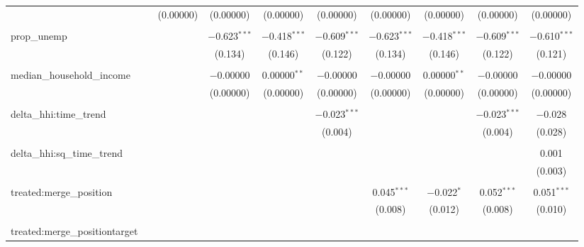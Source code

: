 \begin{table}[H]
{\begin{tabular}{@{\extracolsep{5pt}}lccccccccc}
   &  & (0.00000) & (0.00000) & (0.00000) & (0.00000) & (0.00000) & (0.00000) & (0.00000) & (0.00000) \\  

   & & & & & & & & & \\  

  prop\_unemp &  &  & $-$0.623$^{***}$ & $-$0.418$^{***}$ & $-$0.609$^{***}$ & $-$0.623$^{***}$ & $-$0.418$^{***}$ & $-$0.609$^{***}$ & $-$0.610$^{***}$ \\  

   &  &  & (0.134) & (0.146) & (0.122) & (0.134) & (0.146) & (0.122) & (0.121) \\  

   & & & & & & & & & \\  

  median\_household\_income &  &  & $-$0.00000 & 0.00000$^{**}$ & $-$0.00000 & $-$0.00000 & 0.00000$^{**}$ & $-$0.00000 & $-$0.00000 \\  

   &  &  & (0.00000) & (0.00000) & (0.00000) & (0.00000) & (0.00000) & (0.00000) & (0.00000) \\  

   & & & & & & & & & \\  

  delta\_hhi:time\_trend &  &  &  &  & $-$0.023$^{***}$ &  &  & $-$0.023$^{***}$ & $-$0.028 \\  

   &  &  &  &  & (0.004) &  &  & (0.004) & (0.028) \\  

   & & & & & & & & & \\  

  delta\_hhi:sq\_time\_trend &  &  &  &  &  &  &  &  & 0.001 \\  

   &  &  &  &  &  &  &  &  & (0.003) \\  

   & & & & & & & & & \\  

  treated:merge\_position &  &  &  &  &  & 0.045$^{***}$ & $-$0.022$^{*}$ & 0.052$^{***}$ & 0.051$^{***}$ \\  

   &  &  &  &  &  & (0.008) & (0.012) & (0.008) & (0.010) \\  

   & & & & & & & & & \\  

  treated:merge\_positiontarget &  &  &  &  &  &  &  &  &  \\  


\end{tabular}}
\end{table}
